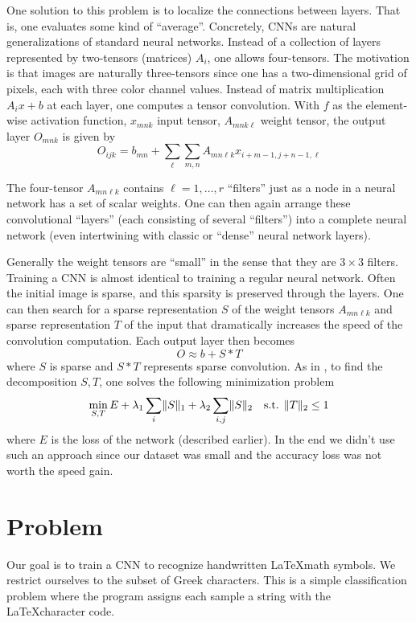\documentclass[12pt,letterpaper,boxed]{article}
\begin{document}
One solution to this problem is to localize the connections between layers. That is, one evaluates some kind of ``average''. Concretely, CNNs are natural generalizations of standard neural networks. Instead of a collection of layers represented by two-tensors (matrices) $A_i$, one allows four-tensors. The motivation is that images are naturally three-tensors since one has a two-dimensional grid of pixels, each with three color channel values. Instead of matrix multiplication $A_i x + b$ at each layer, one computes a tensor convolution. With $f$ as the element-wise activation function, $x_{mnk}$ input tensor, $A_{mnk\ell}$ weight tensor, the output layer $O_{mnk}$ is given by
\[
	O_{ijk}  = b_{mn} + \sum_\ell \sum_{m,n} A_{mn \ell k} x_{i + m - 1, j + n - 1, \ell}
\]

The four-tensor $A_{mn\ell k}$ contains $\ell = 1, \ldots, r$ ``filters'' just as a node in a neural network has a set of scalar weights. One can then again arrange these convolutional ``layers'' (each consisting of several ``filters'') into a complete neural network (even intertwining with classic or ``dense'' neural network layers).

Generally the weight tensors are ``small'' in the sense that they are $3\times3$ filters. Training a CNN is almost identical to training a regular neural network. Often the initial image is sparse, and this sparsity is preserved through the layers. One can then search for a sparse representation $S$ of the weight tensors $A_{mn \ell k}$ and sparse representation $T$ of the input that dramatically increases the speed of the convolution computation. Each output layer then becomes
\[
	O \approx b + S \ast T
\]
where $S$ is sparse and $S \ast T$ represents sparse convolution. As in \cite{bao2015}, to find the decomposition $S, T$, one solves the following minimization problem
\[
	\min_{S, T} E + \lambda_1 \sum_i \lVert S \rVert_1 + \lambda_2 \sum_{i, j} \lVert S \rVert_2 \quad \text{s.t. } \lVert T \rVert_2 \leq 1
\]
where $E$ is the loss of the network (described earlier). In the end we didn't use such an approach since our dataset was small and the accuracy loss was not worth the speed gain.
\section{Problem}
	Our goal is to train a CNN to recognize handwritten \LaTeX math symbols. We restrict ourselves to the subset of Greek characters. This is a simple classification problem where the program assigns each sample a string with the \LaTeX character code.
\end{document}
